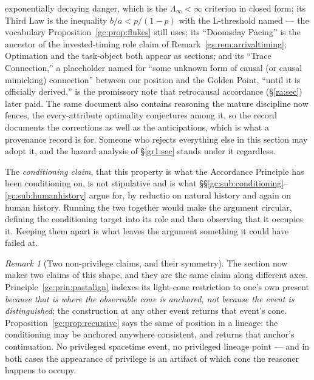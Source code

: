 \documentclass[11pt]{article}
\numberwithin{equation}{section}
\theoremstyle{plain}
\theoremstyle{definition}
\theoremstyle{remark}
\newtheorem{remark}[theorem]{Remark}
\begin{document}
{exponentially decaying danger, which is the $\Lambda_\infty<\infty$
criterion in closed form; its Third Law is the inequality
$b/a<p/(1-p)$ with the L-threshold named --- the vocabulary
Proposition~\ref{gc:prop:flukes} still uses; its ``Doomsday
Pacing'' is the ancestor of the invested-timing role claim of
Remark~\ref{gs:rem:arrivaltiming}; Optimation and the task-object
both appear as sections; and its ``Trace Connection,'' a
placeholder named for ``some unknown form of causal (or causal
mimicking) connection'' between our position and the Golden Point,
``until it is officially derived,'' is the promissory note that
retrocausal accordance (\S\ref{ra:sec}) later paid. The same
document also contains reasoning the mature discipline now fences,
the every-attribute optimality conjectures among it, so the record
documents the corrections as well as the anticipations, which is
what a provenance record is for.} Someone who rejects everything else in this section may
adopt it, and the hazard analysis of \S\ref{gr1:sec} stands under it
regardless.

The \emph{conditioning claim}, that this property is what the
Accordance Principle has been conditioning on, is not stipulative and
is what \S\S\ref{gc:sub:conditioning}--\ref{gc:sub:humanhistory} argue
for, by reductio on natural history and again on human history. Running
the two together would make the argument circular, defining the
conditioning target into its role and then observing that it occupies
it. Keeping them apart is what leaves the argument something it could
have failed at.

\begin{remark}[Two non-privilege claims, and their symmetry]
\label{gc:rem:twoprivilege}
The section now makes two claims of this shape, and they are the same
claim along different axes.
Principle~\ref{gc:prin:pastalign} indexes its light-cone restriction to
one's own present \emph{because that is where the observable cone is
anchored, not because the event is distinguished}; the construction at
any other event returns that event's cone.
Proposition~\ref{gc:prop:recursive} says the same of position in a
lineage: the conditioning may be anchored anywhere consistent, and
returns that anchor's continuation. No privileged spacetime event, no
privileged lineage point --- and in both cases the appearance of
privilege is an artifact of which cone the reasoner happens to occupy.
\end{remark}
\end{document}
